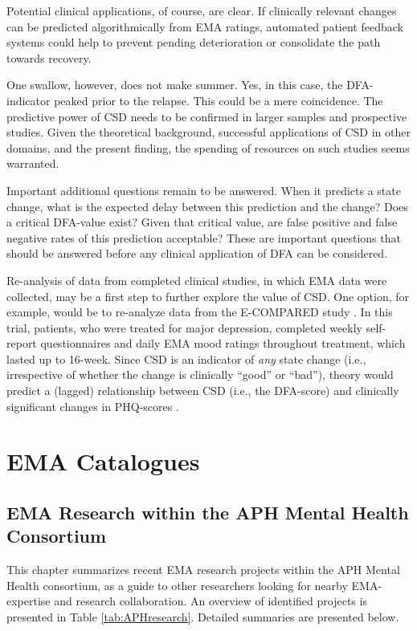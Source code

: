 \documentclass[]{book}
\begin{document}
Potential clinical applications, of course, are clear. If clinically
relevant changes can be predicted algorithmically from EMA ratings,
automated patient feedback systems could help to prevent pending
deterioration or consolidate the path towards recovery.

One swallow, however, does not make summer. Yes, in this case, the
DFA-indicator peaked prior to the relapse. This could be a mere
coincidence. The predictive power of CSD needs to be confirmed in larger
samples and prospective studies. Given the theoretical background,
successful applications of CSD in other domains, and the present
finding, the spending of resources on such studies seems warranted.

Important additional questions remain to be answered. When it predicts a
state change, what is the expected delay between this prediction and the
change? Does a critical DFA-value exist? Given that critical value, are
false positive and false negative rates of this prediction acceptable?
These are important questions that should be answered before any
clinical application of DFA can be considered.

Re-analysis of data from completed clinical studies, in which EMA data
were collected, may be a first step to further explore the value of CSD.
One option, for example, would be to re-analyze data from the E-COMPARED
study \citep{Kleiboer2016}. In this trial, patients, who were treated
for major depression, completed weekly self-report questionnaires
\citep[the Patient Health Questionnaire; PHQ-8,][]{Kroenke2009} and
daily EMA mood ratings throughout treatment, which lasted up to 16-week.
Since CSD is an indicator of \emph{any} state change (i.e., irrespective
of whether the change is clinically ``good'' or ``bad''), theory would
predict a (lagged) relationship between CSD (i.e., the DFA-score) and
clinically significant changes in PHQ-scores \citep{Jacobson1991}.

\part{EMA Catalogues}\label{part-ema-catalogues}

\chapter{EMA Research within the APH Mental Health
Consortium}\label{catalogue}

This chapter summarizes recent EMA research projects within the APH
Mental Health consortium, as a guide to other researchers looking for
nearby EMA-expertise and research collaboration. An overview of
identified projects is presented in Table \ref{tab:APHresearch}.
Detailed summaries are presented below.
\end{document}
